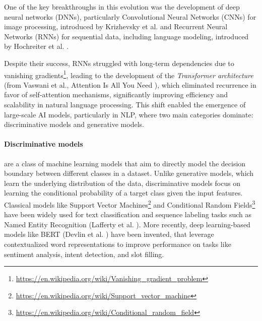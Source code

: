 One of the key breakthroughs in this evolution was the development of deep neural
networks (DNNs), particularly Convolutional Neural Networks (CNNs) for image
processing, introduced by Krizhevsky et al. \cite{articleCNN} and Recurrent
Neural Networks (RNNs) for sequential data, including language modeling,
introduced by Hochreiter et al. \cite{articleRNN}.

Despite their success, RNNs struggled with long-term dependencies due to
vanishing gradients\footnote{\url{https://en.wikipedia.org/wiki/Vanishing_gradient_problem}},
leading to the development of the \emph{Transformer architecture} (from Vaswani
et al., Attention Is All You Need \cite{vaswani2023attentionneed}), which
eliminated recurrence in favor of self-attention mechanisms, significantly improving
efficiency and scalability in natural language processing. This shift enabled
the emergence of large-scale AI models, particularly in NLP, where two main
categories dominate: discriminative models and generative models.

\paragraph{Discriminative models}
are a class of machine learning models that aim to directly model the decision
boundary between different classes in a dataset. Unlike generative models, which
learn the underlying distribution of the data, discriminative models focus on learning
the conditional probability of a target class given the input features.
Classical models like Support Vector Machines\footnote{\url{https://en.wikipedia.org/wiki/Support_vector_machine}}
and Conditional Random Fields\footnote{\url{https://en.wikipedia.org/wiki/Conditional_random_field}}
have been widely used for text classification and sequence labeling tasks such
as Named Entity Recognition (Lafferty et al. \cite{crf}). More recently, deep learning-based
models like BERT (Devlin et al. \cite{devlin2019bertpretrainingdeepbidirectional})
have been invented, that leverage contextualized word representations to improve
performance on tasks like sentiment analysis, intent detection, and slot filling.

